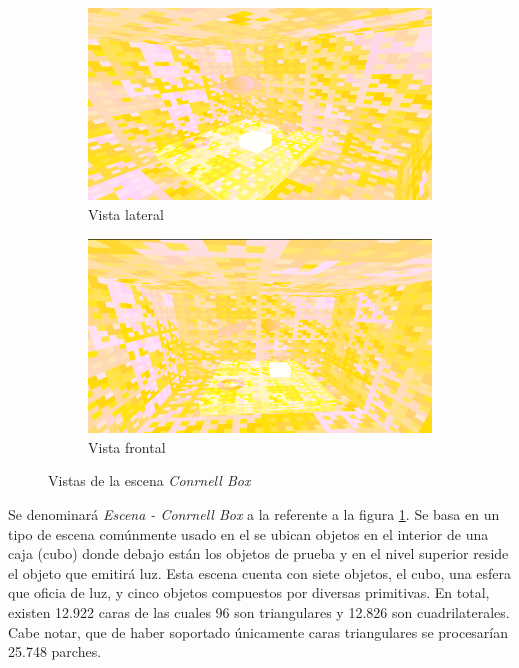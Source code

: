 \begin{figure}[H]
	\centering
	\begin{subfigure}{0.45\textwidth}
		\includegraphics[width=1\linewidth]{assets/cornell}
		\caption{Vista lateral}
	\end{subfigure}
	\begin{subfigure}{0.45\textwidth}
		\includegraphics[width=1\linewidth]{assets/cornell2}
		\caption{Vista frontal}
	\end{subfigure}
	\caption{Vistas de la escena \textit{Conrnell Box}}
	\label{img:cornell}
\end{figure}

Se denominará \textit{Escena - Conrnell Box} a la referente a la figura \ref{img:cornell}. Se basa en un tipo de escena comúnmente usado en el se ubican objetos en el interior de una caja (cubo) donde debajo están los objetos de prueba y en el nivel superior reside el objeto que emitirá luz. Esta escena cuenta con siete objetos, el cubo, una esfera que oficia de luz, y cinco objetos compuestos por diversas primitivas. En total, existen 12.922 caras de las cuales 96 son triangulares y 12.826 son cuadrilaterales. Cabe notar, que de haber soportado únicamente caras triangulares se procesarían 25.748 parches.


